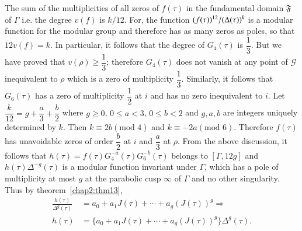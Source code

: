 The sum of the multiplicities of all zeros of $f(\tau)$ in the
fundamental domain $\mathfrak{F}$ of $\Gamma$ i.e. the degree $v(f)$
is $k/12$. For, the function $(f(\tau))^{12}/\break (\Delta(\tau))^k$ is a
modular function for the modular group and therefore has as many zeros
as poles, so that $12v(f)=k$. In particular, it follows that the
degree of $G_4(\tau)$ is $\dfrac{1}{3}$. But we have proved that
$v(\rho)\geq \dfrac{1}{3}$; therefore $G_4(\tau)$ does not vanish at
any point of $\mathscr{G}$ inequivalent to $\rho$ which is a zero of
multiplicity $\dfrac{1}{3}$. Similarly, it follows that $G_6(\tau)$
has a zero of multiplicity $\dfrac{1}{2}$ at $i$ and has no zero
inequivalent to $i$. Let $\dfrac{k}{12}=g+\dfrac{a}{3}+\dfrac{b}{2}$
where $g\geq 0$, $0\leq a <3$, $0\leq b<2$ and $g,a,b$ are integers
uniquely determined by $k$. Then $k\equiv 2b(\text{mod } 4)$ and $k\equiv
-2a(\text{mod } 6)$. Therefore $f(\tau)$ has unavoidable zeros of order
$\dfrac{b}{2}$ at $i$ and $\dfrac{a}{3}$ at $\rho$. From the above
discussion, it follows that $h(\tau)=f(\tau) G^{-a}_4(\tau)
G^{-b}_6(\tau)$ belongs to $[\Gamma, 12g]$ and $h(\tau)
\Delta^{-g}(\tau)$ is a modular function invariant under $\Gamma$,
which has a pole of multiplicity at most $g$ at the parabolic cusp
$\infty$ of $\Gamma$ and no other singularity. Thus by theorem~\ref{chap2:thm13},
\begin{align*}
\frac{h(\tau)}{\Delta^g(\tau)} & = a_0 + a_1 J(\tau) + \cdots + a_g
(J(\tau))^g\Longrightarrow \\
h(\tau) & = \{a_0+a_1J(\tau)+\cdots + a_g(J(\tau))^g\} \Delta^g(\tau).
\end{align*}\pageoriginale

